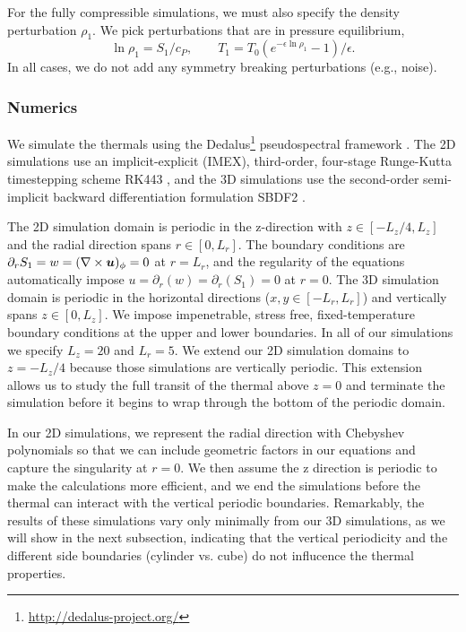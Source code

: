 For the fully compressible simulations, we must also specify the density perturbation $\rho_1$.
We pick perturbations that are in pressure equilibrium,
\begin{equation}
\ln\rho_1 = S_1/c_P, \qquad T_1 = T_0(e^{-\epsilon\ln\rho_1} - 1)/\epsilon.
\end{equation}
In all cases, we do not add any symmetry breaking perturbations (e.g., noise).


\subsubsection{Numerics}
We simulate the thermals using the  Dedalus\footnote{\url{http://dedalus-project.org/}} pseudospectral framework \cite{burns&all2016, burns&all2019}.
The 2D simulations use an implicit-explicit (IMEX), third-order, four-stage Runge-Kutta timestepping scheme RK443 \cite{ascher&all1997}, and the 3D simulations use the second-order semi-implicit backward differentiation formulation SBDF2 \cite{wang&ruuth2008}.

The 2D simulation domain is periodic in the z-direction with $z \in [-L_z/4, L_z]$ and the radial direction spans $r \in [0, L_r]$.
The boundary conditions are $\partial_r S_1 = w = (\nabla\times\bm{u})_\phi = 0$ at $r = L_r$, and the regularity of the equations automatically impose $u = \partial_r(w) = \partial_r(S_1) = 0$ at $r = 0$.
The 3D simulation domain is periodic in the horizontal directions ($x, y \in [-L_r, L_r]$) and vertically spans $z \in [0, L_z]$.
We impose impenetrable, stress free, fixed-temperature boundary conditions at the upper and lower boundaries.
In all of our simulations we specify $L_z = 20$ and $L_r = 5$.
We extend our 2D simulation domains to $z = -L_z/4$ because those simulations are vertically periodic.
This extension allows us to study the full transit of the thermal above $z = 0$ and terminate the simulation before it begins to wrap through the bottom of the periodic domain.

In our 2D simulations, we represent the radial direction with Chebyshev polynomials so that we can include geometric factors in our equations and capture the singularity at $r = 0$.
We then assume the z direction is periodic to make the calculations more efficient, and we end the simulations before the thermal can interact with the vertical periodic boundaries.
Remarkably, the results of these simulations vary only minimally from our 3D simulations, as we will show in the next subsection, indicating that the vertical periodicity and the different side boundaries (cylinder vs. cube) do not influcence the thermal properties.

